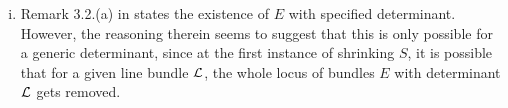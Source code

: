 \documentclass[letterpaper,10pt]{article}
\theoremstyle{remark}
\begin{document}
\begin{enumerate}[(i)]
    \item Remark 3.2.(a) in \cite{seshadri} states the existence of $E$ with specified determinant. However, the reasoning therein seems to suggest that this is only possible for a generic determinant, since at the first instance of shrinking $S$, it is possible that for a given line bundle $\mathcal{L}$, the whole locus of bundles $E$ with determinant $\mathcal{L}$ gets removed.
\end{enumerate}





\end{document}
